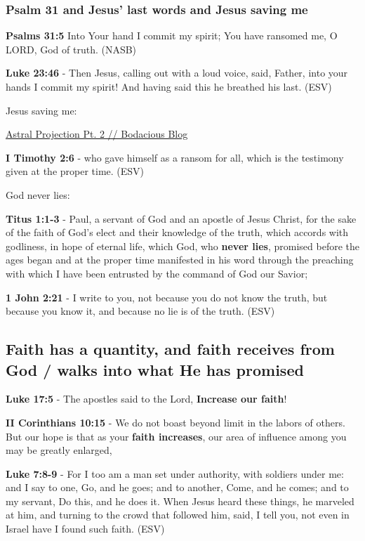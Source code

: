 \documentclass[11pt]{article}
\begin{document}
\subsubsection{Psalm 31 and Jesus' last words and Jesus saving me}
\label{sec:org3b8865a}

\textbf{Psalms 31:5}  Into Your hand I commit my spirit; You have ransomed me, O LORD, God of truth.  (NASB)

\textbf{Luke 23:46} - Then Jesus, calling out with a loud voice, said, Father, into your hands I commit my spirit! And having said this he breathed his last.  (ESV)

Jesus saving me:

\href{https://web.archive.org/web/20220402091720/https://mullikine.github.io/posts/astral-projection-pt-2/}{Astral Projection Pt. 2 // Bodacious Blog}

\textbf{I Timothy 2:6} - who gave himself as a ransom for all, which is the testimony given at the proper time. (ESV)

God never lies:

\textbf{Titus 1:1-3} - Paul, a servant of God and an apostle of Jesus Christ, for the sake of the faith of God's elect and their knowledge of the truth, which accords with godliness, in hope of eternal life, which God, who \textbf{never lies}, promised before the ages began and at the proper time manifested in his word through the preaching with which I have been entrusted by the command of God our Savior;

\textbf{1 John 2:21} -  I write to you, not because you do not know the truth, but because you know it, and because no lie is of the truth.  (ESV)

\subsection{Faith has a quantity, and faith receives from God / walks into what He has promised}
\label{sec:orgbe734d7}
\textbf{Luke 17:5} - The apostles said to the Lord, \textbf{Increase our faith}!

\textbf{II Corinthians 10:15} - We do not boast beyond limit in the labors of others. But our hope is that as your \textbf{faith increases}, our area of influence among you may be greatly enlarged,

\textbf{Luke 7:8-9} - For I too am a man set under authority, with soldiers under me: and I say to one, Go, and he goes; and to another, Come, and he comes; and to my servant, Do this, and he does it. When Jesus heard these things, he marveled at him, and turning to the crowd that followed him, said, I tell you, not even in Israel have I found such faith. (ESV)
\end{document}
